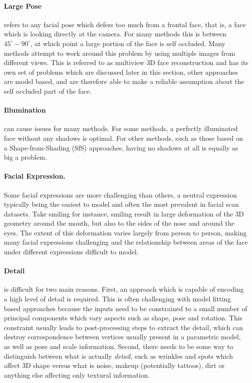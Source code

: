 \paragraph{Large Pose} refers to any facial pose which defers too much
from a frontal face, that is, a face which is looking directly at the
camera. For many methods this is between $45^\circ - 90^\circ$, at
which point a large portion of the face is self occluded. Many methods
attempt to work around this problem by using multiple images from
different views. This is referred to as multiview 3D face
reconstruction and has its own set of problems which are discussed
later in this section, other approaches are model based, and are
therefore able to make a reliable assumption about the self occluded
part of the face.

\paragraph{Illumination} can cause issues for many methods. For some
methods, a perfectly illuminated face without any shadows is
optimal. For other methods, such as those based on a
Shape-from-Shading (SfS) approaches, having no shadows at all is
equally as big a problem.

\paragraph{Facial Expression.} Some facial expressions are more
challenging than others, a neutral expression typically being the
easiest to model and often the most prevalent in facial scan
datasets. Take smiling for instance, smiling result in large
deformation of the 3D geometry around the mouth, but also to the sides
of the nose and around the eyes. The extent of this deformation varies
largely from person to person, making many facial expressions
challenging and the relationship between areas of the face under
different expressions difficult to model.

\paragraph{Detail} is difficult for two main reasons. First, an
approach which is capable of encoding a high level of detail is
required. This is often challenging with model fitting based
approaches because the inputs need to be constrained to a small number
of principal components which vary aspects such as shape, pose and
rotation. This constraint usually leads to post-processing steps to
extract the detail, which can destroy correspondence between vertices
usually present in a parametric model, as well as pose and scale
information. Second, there needs to be some way to distinguish between
what is actually \textit{detail}, such as wrinkles and spots which
affect 3D shape versus what is noise, makeup (potentially tattoos),
dirt or anything else affecting only textural information.

